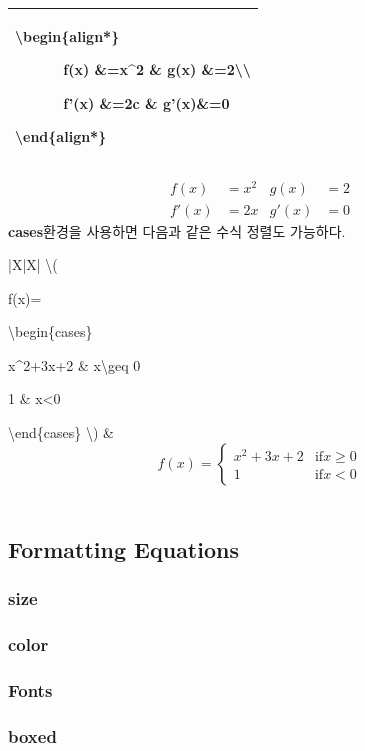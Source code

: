 \documentclass[12pt]{article}
\begin{document}
	\begin{tabularx}{\textwidth\onehalfspacing}{|X|}
		\hline
		\textbackslash begin\{align*\}
		
		\ \ \ \ \ \ f(x) \&=x\textasciicircum2 \& g(x) \&=2\textbackslash\textbackslash
		
		\ \ \ \ \ \ f'(x) \&=2c \& g'(x)\&=0
		
		\textbackslash end\{align*\}\\
		\hline
	\end{tabularx}
	\begin{align*}
	f(x) &=x^2 & g(x)&=2\\
	f'(x) &=2x & g'(x)&=0
	\end{align*}
	\textbf{cases}환경을 사용하면 다음과 같은 수식 정렬도 가능하다.\newline
	
	\begin{tabularx}{\textwidth\onehalfspacing}{|X|X|}
		\hline
		\textbackslash(
		
		f(x)=
		
		\textbackslash begin\{cases\}
		
		x\textasciicircum2+3x+2 \& x\textbackslash geq 0
		
		1 \&\text{if} x<0
		
		\textbackslash end\{cases\}
		\textbackslash)
		&
		\[f(x)=
		\begin{cases}
		x^2+3x+2 & \text{if} x \geq 0\\
		1 & \text{if} x <0
		\end{cases}\]
		\\
		\hline
	\end{tabularx}
	\subsection{Formatting Equations}
	\subsubsection{size}
	\subsubsection{color}
	\subsubsection{Fonts}
	\subsubsection{boxed}
\end{document}
